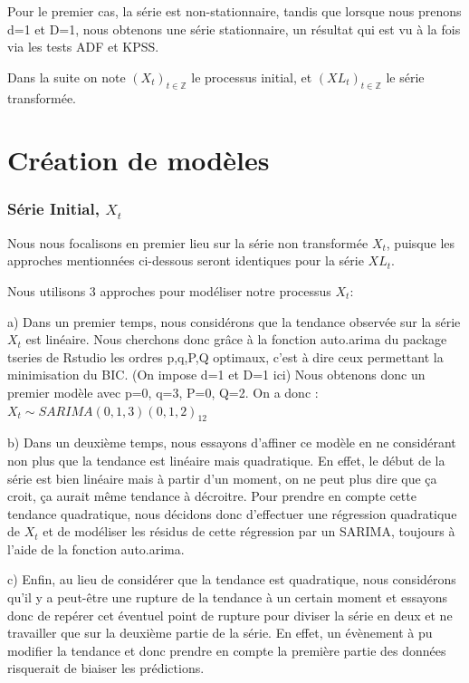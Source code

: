 \documentclass[12pt,a4paper]{book}
\newcommand{\1}{\mathds{1}}
\begin{document}
Pour le premier cas, la série est non-stationnaire, tandis que lorsque nous prenons d=1 et D=1, nous obtenons une série stationnaire, un résultat qui est vu à la fois via les tests ADF et KPSS. 

\noindent 
Dans la suite on note $(X_t)_{t\in \mathbb{Z}}$ le processus initial, et $(XL_t)_{t\in \mathbb{Z}}$  le série transformée.


\vspace{5 mm}
\section{Création de modèles}

\vspace{5 mm}
\subsubsection{Série Initial, $X_t$}

Nous nous focalisons en premier lieu sur la série non transformée $X_t$, puisque les approches mentionnées ci-dessous seront identiques pour la série $XL_t$.

Nous utilisons 3 approches pour modéliser notre processus $X_t$:


\begin{description}
  \item a) Dans un premier temps, nous considérons que la tendance observée sur la série $X_t$ est linéaire. Nous cherchons donc grâce à la fonction auto.arima du package tseries de Rstudio les ordres p,q,P,Q optimaux, c'est à dire ceux permettant la minimisation du BIC. (On impose d=1 et D=1 ici)
Nous obtenons donc un premier modèle avec p=0, q=3, P=0, Q=2. On a donc : 
$X_t \sim SARIMA(0,1,3)(0,1,2)_{12}$
  \item b) Dans un deuxième temps, nous essayons d'affiner ce modèle en ne considérant non plus que la tendance est linéaire mais quadratique. En effet, le début de la série est bien linéaire mais à partir d'un moment, on ne peut plus dire que ça croit, ça aurait même tendance à décroitre. Pour prendre en compte cette tendance quadratique, nous décidons donc d'effectuer une régression quadratique de $X_t$ et de modéliser les résidus de cette régression par un SARIMA, toujours à l'aide de la fonction auto.arima.
  
  \item c) Enfin, au lieu de considérer que la tendance est quadratique, nous considérons qu'il y a peut-être une rupture de la tendance à un certain moment et essayons donc de repérer cet éventuel point de rupture pour diviser la série en deux et ne travailler que sur la deuxième partie de la série. En effet, un évènement à pu modifier la tendance et donc prendre en compte la première partie des données risquerait de biaiser les prédictions.

\end{description}
\noindent 
\end{document}
